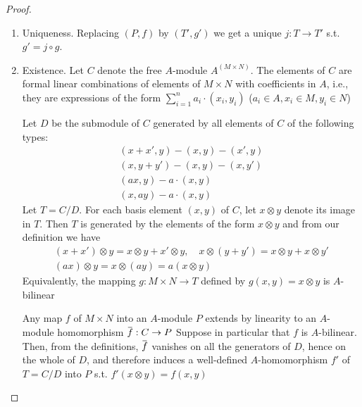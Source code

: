 \documentclass[11pt]{article}
\begin{document}
\begin{proof}


\begin{enumerate}
\item Uniqueness. Replacing \((P,f)\) by \((T',g')\) we get a unique \(j:T\to T'\) s.t. \(g'=j\circ g\).
\item Existence. Let \(C\) denote the free \(A\)-module \(A^{(M\times N)}\). The elements of \(C\) are
formal linear combinations of elements of \(M\times N\) with coefficients in \(A\), i.e., they are
expressions of the form \(\sum_{i=1}^na_i\cdot(x_i,y_i)\) (\(a_i\in A,x_i\in M,y_i\in N\))

Let \(D\) be the submodule of \(C\) generated by all elements of \(C\) of the following
types:
\begin{gather*}
(x+x',y)-(x,y)-(x',y)\\
(x,y+y')-(x,y)-(x,y')\\
(ax,y)-a\cdot(x,y)\\
(x,ay)-a\cdot(x,y)
\end{gather*}
Let \(T=C/D\). For each basis element \((x,y)\) of \(C\), let \(x\otimes y\) denote its image
in \(T\). Then \(T\) is generated by the elements of the form \(x\otimes y\) and from our
definition we have
\begin{gather*}
(x+x')\otimes y=x\otimes y+x'\otimes y,\quad x\otimes(y+y')=x\otimes y+x\otimes y'\\
(ax)\otimes y=x\otimes (ay)=a(x\otimes y)
\end{gather*}
Equivalently, the mapping \(g:M\times N\to T\) defined by \(g(x,y)=x\otimes y\) is \(A\)-bilinear

Any map \(f\) of \(M\times N\) into an \(A\)-module \(P\) extends by linearity to an \(A\)-module
homomorphism \(\barf:C\to P\)
Suppose in particular that \(f\) is \(A\)-bilinear. Then, from the
definitions, \(\barf\) vanishes on all the generators of \(D\), hence on the whole of \(D\), and
therefore induces a well-defined \(A\)-homomorphism \(f'\) of \(T=C/D\) into \(P\)
s.t. \(f'(x\otimes y)=f(x,y)\)
\end{enumerate}
\end{proof}
\end{document}
